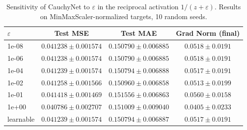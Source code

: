 \begin{table}[ht]\centering
\caption{Sensitivity of CauchyNet to $\varepsilon$ in the reciprocal activation $1/(z+\varepsilon)$.
Results on MinMaxScaler-normalized targets, 10 random seeds.}
\label{tab:epsilon}
\begin{tabular}{lccc}
\toprule
$\varepsilon$ & Test MSE & Test MAE & Grad Norm (final) \\
\midrule
1e-08 & $0.041238 \pm 0.001574$ & $0.150790 \pm 0.006885$ & $0.0518 \pm 0.0191$ \\
1e-06 & $0.041238 \pm 0.001574$ & $0.150790 \pm 0.006885$ & $0.0518 \pm 0.0191$ \\
1e-04 & $0.041239 \pm 0.001574$ & $0.150794 \pm 0.006888$ & $0.0517 \pm 0.0191$ \\
1e-02 & $0.041258 \pm 0.001566$ & $0.150960 \pm 0.006858$ & $0.0513 \pm 0.0199$ \\
1e-01 & $0.041418 \pm 0.001469$ & $0.151556 \pm 0.006863$ & $0.0560 \pm 0.0158$ \\
1e+00 & $0.040786 \pm 0.002707$ & $0.151009 \pm 0.009040$ & $0.0405 \pm 0.0233$ \\
learnable & $0.041239 \pm 0.001574$ & $0.150794 \pm 0.006887$ & $0.0517 \pm 0.0191$ \\
\bottomrule
\end{tabular}
\end{table}
